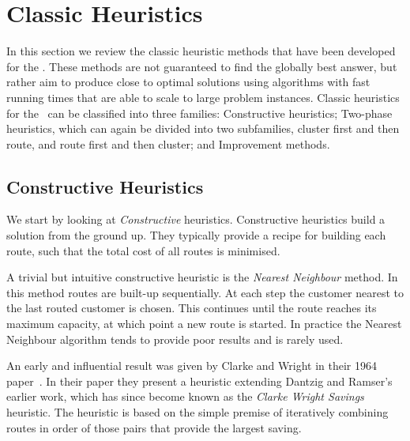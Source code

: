 \section{Classic Heuristics}
\label{sec:ch}

In this section we review the classic heuristic methods that have been developed for the \VRP. These methods are not guaranteed to find the globally best answer, but rather aim to produce close to optimal solutions using algorithms with fast running times that are able to scale to large problem instances. Classic heuristics for the \VRP\ can be classified into three families: Constructive heuristics; Two-phase heuristics, which can again be divided into two subfamilies, cluster first and then route, and route first and then cluster; and Improvement methods.

\subsection{Constructive Heuristics}
\label{subsec:conheu}

We start by looking at \emph{Constructive} heuristics. Constructive heuristics build a solution from the ground up. They typically provide a recipe for building each route, such that the total cost of all routes is minimised.

A trivial but intuitive constructive heuristic is the \emph{Nearest Neighbour} method. In this method routes are built-up sequentially. At each step the customer nearest to the last routed customer is chosen. This continues until the route reaches its maximum capacity, at which point a new route is started. In practice the Nearest Neighbour algorithm tends to provide poor results and is rarely used. 
 

An early and influential result was given by Clarke and Wright in their 1964 paper~\cite{clark:1964}. In their paper they present a heuristic extending Dantzig and Ramser's earlier work, which has since become known as the \emph{Clarke Wright Savings} heuristic. The heuristic is based on the simple premise of iteratively combining routes in order of those pairs that provide the largest saving. 


